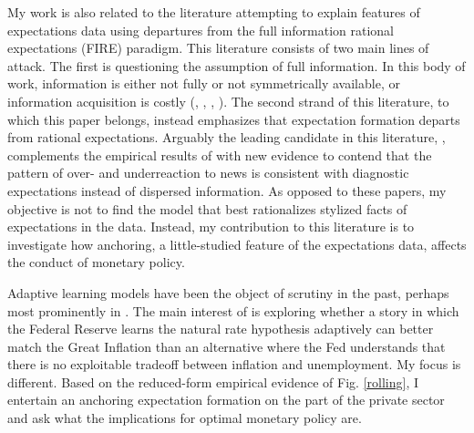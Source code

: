 \documentclass[11pt]{article}
\renewcommand{\[}{\begin{equation}}
\renewcommand{\]}{\end{equation}}
\begin{document}
My work is also related to the literature attempting to explain features of expectations data using departures from the full information rational expectations (FIRE) paradigm. This literature consists of two main lines of attack. The first is questioning the assumption of full information. In this body of work, information is either not fully or not symmetrically available, or information acquisition is costly (\cite{mankiw2002sticky}, \cite{sims2003}, \cite{mackowiak2009optimal}, \cite{angeletos2009policy}). The second strand of this literature, to which this paper belongs, instead emphasizes that expectation formation departs from rational expectations. Arguably the leading candidate in this literature, \cite{bordalo2018diagnostic}, complements the empirical results of \cite{coibion2015information} with new evidence to contend that the pattern of over- and underreaction to news is consistent with diagnostic expectations instead of dispersed information. As opposed to these papers, my objective is not to find the model that best rationalizes stylized facts of expectations in the data. Instead, my contribution to this literature is to investigate how anchoring, a little-studied feature of the expectations data, affects the conduct of monetary policy. 

Adaptive learning models have been the object of scrutiny in the past, perhaps most prominently in \cite{sargent1999}. The main interest of \cite{sargent1999} is exploring whether a story in which the Federal Reserve learns the natural rate hypothesis adaptively can better match the Great Inflation than an alternative where the Fed understands that there is no exploitable tradeoff between inflation and unemployment. My focus is different. Based on the reduced-form empirical evidence of Fig. \ref{rolling}, I entertain an anchoring expectation formation on the part of the private sector and ask what the implications for optimal monetary policy are.

\end{document}
